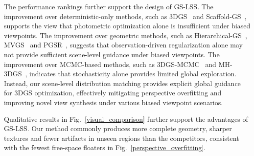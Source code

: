 \documentclass[lettersize,journal]{IEEEtran}
\begin{document}
The performance rankings further support the design of GS-LSS. The improvement over deterministic-only methods, such as 3DGS~\cite{3dgs} and Scaffold-GS~\cite{scaffold}, supports the view that photometric optimization alone is insufficient under biased viewpoints.
The improvement over geometric methods, such as Hierarchical-GS~\cite{hierarchical}, MVGS~\cite{mvgs} and PGSR~\cite{pgsr}, 
suggests that observation-driven regularization alone may not provide sufficient scene-level guidance under biased viewpoints. 
The improvement over MCMC-based methods, such as 3DGS-MCMC~\cite{mcmc} and MH-3DGS~\cite{mh3dgs}, indicates that
stochasticity alone provides limited global exploration. 
Instead, our scene-level distribution matching provides explicit global guidance for 3DGS optimization, effectively mitigating perspective overfitting and improving novel view synthesis under various biased viewpoint scenarios. 

Qualitative results in Fig.~\ref{visual_comparison} further support the advantages of GS-LSS. Our method commonly produces more complete geometry, sharper textures and fewer artifacts in unseen regions than the competitors, consistent with the fewest free-space floaters in Fig.~\ref{perspective_overfitting}. 
\end{document}
